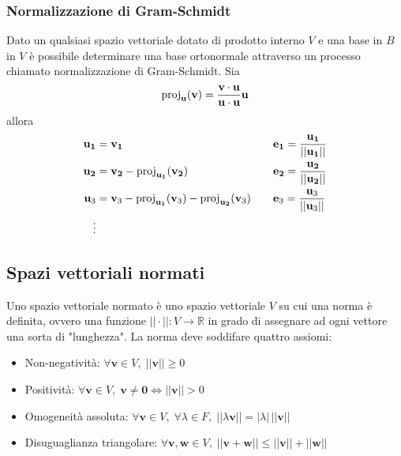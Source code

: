 \documentclass{article}
\begin{document}
    \subsubsection{Normalizzazione di Gram-Schmidt}
    Dato un qualsiasi spazio vettoriale dotato di prodotto interno $V$ e una base in $B$ in $V$ è possibile determinare una base ortonormale 
    attraverso un processo chiamato normalizzazione di Gram-Schmidt. Sia 
    \[
        \textnormal{proj}_{\mathbf{u}}(\mathbf{v}) = \frac{\mathbf{v} \cdot \mathbf{u}}{\mathbf{u} \cdot \mathbf{u}} \mathbf{u}
    \]
    allora
    \[
        \begin{aligned}
            \mathbf{u_1} &= \mathbf{v_1} &\quad& \mathbf{e_1} = \frac{\mathbf{u_1}}{||\mathbf{u_1}||} \\
            \mathbf{u_2} &= \mathbf{v_2} - \textnormal{proj}_{\mathbf{u_1}}(\mathbf{v_2}) &\quad& \mathbf{e_2} = \frac{\mathbf{u_2}}{||\mathbf{u_2}||} \\
            \mathbf{u}_3 &= \mathbf{v}_3 - \textnormal{proj}_{\mathbf{u_1}}(\mathbf{v}_3) - \textnormal{proj}_{\mathbf{u_2}}(\mathbf{v}_3) &\quad& \mathbf{e}_3 = \frac{\mathbf{u}_3}{||\mathbf{u}_3||} \\
            \vdots
        \end{aligned}
    \]




\vspace{10pt}
\subsection{Spazi vettoriali normati}
    Uno spazio vettoriale normato è uno spazio vettoriale $V$ su cui una norma è definita, ovvero una funzione $||\cdot||: V \rightarrow \mathbb{R}$ in grado di assegnare 
    ad ogni vettore una sorta di "lunghezza". La norma deve soddifare quattro assiomi:
    \begin{itemize}
        \item Non-negatività: $\forall \mathbf{v} \in V, \; ||\mathbf{v}|| \geq 0$
        \item Positività: $\forall \mathbf{v} \in V, \; \mathbf{v} \neq \mathbf{0} \iff ||\mathbf{v}|| > 0$
        \item Omogeneità assoluta: $\forall \mathbf{v} \in V, \; \forall \lambda \in F, \; ||\lambda\mathbf{v}|| = |\lambda|\,||\mathbf{v}||$
        \item Disuguaglianza triangolare: $\forall \mathbf{v}, \mathbf{w} \in V, \; ||\mathbf{v} + \mathbf{w}|| \leq ||\mathbf{v}|| + ||\mathbf{w}||$
    \end{itemize}
\end{document}
